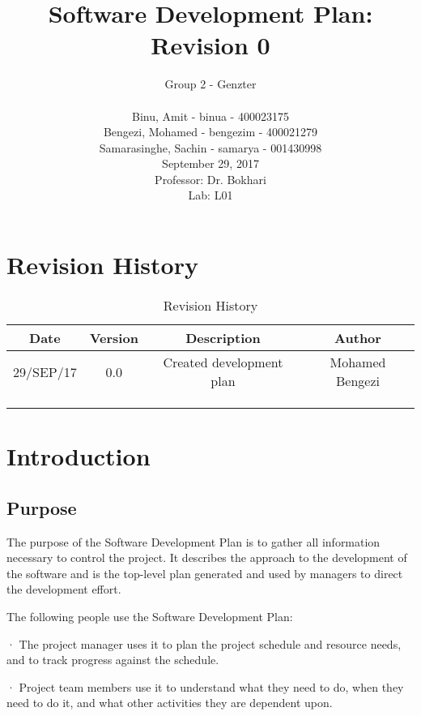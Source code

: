 \documentclass[12pt]{article}
\title{Software Development Plan: Revision 0}
\author{Group 2 - Genzter \\
		\\ Binu, Amit - binua - 400023175
		\\ Bengezi, Mohamed - bengezim - 400021279
		\\ Samarasinghe, Sachin - samarya - 001430998
		\\ September 29, 2017
		\\Professor: Dr. Bokhari
		\\ Lab: L01}
\begin{document}
\maketitle

\newpage

{\centering
  \tableofcontents\par
}

\newpage
\section{Revision History}
\begin{table}[h]
\begin{center}
\begin{tabular}{ | c | c | c | c | }
\hline
 Date & Version & Description & Author \\ 
\hline
 29/SEP/17 & 0.0 & Created development plan & Mohamed Bengezi \\  
\hline
  & & & \\
\hline
 & & & \\
\hline 
 & & & \\ 
\hline 
\end{tabular}
\end{center}
\caption{Revision History}
\end{table}

\newpage
\section{Introduction}
\subsection{Purpose}
The purpose of the Software Development Plan is to gather all information necessary to control the project. It describes the approach to the development of the software and is the top-level plan generated and used by managers to direct the development effort.

The following people use the Software Development Plan:

·         The project manager uses it to plan the project schedule and resource needs, and to track progress against the schedule.

·         Project team members use it to understand what they need to do, when they need to do it, and what other activities they are dependent upon.

\newpage
\end{document}

